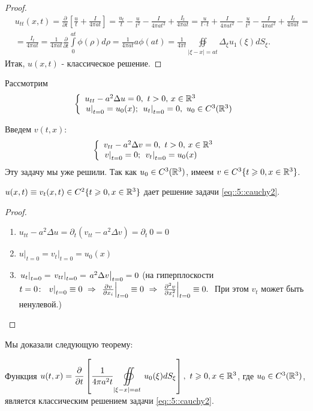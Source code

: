 \documentclass[../main.tex]{subfiles}
\begin{document}
\begin{proof}
\begin{equation*}
\begin{split}
&u_{tt}(x, t)=\frac{\partial}{\partial t}\left[\frac{u}{t}+\frac{I}{4\pi at} \right]=\frac{u_t}{t}-\frac{u}{t^2}-\frac{I}{4\pi at^2}+\frac{I_t}{4\pi at}=\frac{u}{t\cdot t}+\frac{I}{4\pi at^2}-\frac{u}{t^2}-\frac{I}{4\pi at^2}+\frac{I_t}{4\pi at}=\\
&=\frac{I_t}{4\pi at}=\frac{1}{4\pi at}\frac{\partial}{\partial t}\int\limits_0^{at}\phi (\rho )d\rho = \frac{1}{4\pi at}a\phi(at)=\frac{1}{4\pi t}\oiint\limits_{|\xi - x|=at}\Delta_{\xi}u_1(\xi )dS_{\xi}.
\end{split}
\end{equation*}
Итак, $u(x, t)$ - классическое решение.
\end{proof}

Рассмотрим
\begin{equation}
\left\{
  \begin{array}{ll}
  u_{tt}-a^2\Delta u=0,\ t>0,\, x\in \mathbb{R}^3\\
  \left. u\right|_{t=0}=u_0(x);\ \left. u_t\right|_{t=0}=0,\ u_0\in C^3(\mathbb{R}^3)
  \end{array}
\right.
\label{eq::5::cauchy2}
\end{equation}

Введем $v(t, x)$:
\[
\left\{
  \begin{array}{ll}
  v_{tt}-a^2\Delta v=0,\ t>0,\, x\in \mathbb{R}^3\\
  \left. v\right|_{t=0}=0;\ \left. v_t\right|_{t=0}=u_0(x)
  \end{array}
\right.
\]
Эту задачу мы уже решили. Так как $u_0\in C^3(\mathbb{R}^3)$, имеем $v\in C^3\{t\geqslant 0, x\in\mathbb{R}^3\}$.
\begin{statement}
$u(x, t)\equiv v_t(x, t)\in C^2\{t\geqslant 0, x\in\mathbb{R}^3 \}$ дает решение задачи \eqref{eq::5::cauchy2}.
\end{statement}
\begin{proof}$\ $
\begin{enumerate}
\item $u_{tt} - a^2 \Delta u = \partial_t (v_{tt} - a^2 \Delta v) = \partial_t\: 0 = 0$
\item $\left. u\right|_{t=0}=\left. v_t\right|_{t=0}=u_0(x)$
\item $\left. u_t\right|_{t=0} = \left. v_{tt}\right|_{t=0}=\left. a^2 \Delta v\right|_{t=0}=0$ (на гиперплоскости $t=0\colon\ \while{v}{t=0} \equiv 0\ \Rightarrow\ \while{\pd{v}{x_i}}{t=0} \equiv 0\ \Rightarrow\ \while{\pdd{v}{x_i}}{t=0} \equiv 0.\;$ При этом $v_t$ может быть ненулевой.)
\end{enumerate}
\end{proof}
Мы доказали следующую теорему:
\begin{theorem}
Функция $u(t,x)=\dfrac{\partial}{\partial t}\left[\dfrac{1}{4\pi a^2t}\displaystyle\oiint\limits_{|\xi -x|=at}u_0(\xi )dS_{\xi } \right],\ t\geqslant 0,x\in\mathbb{R}^3$, где $u_0\in C^3(\mathbb{R}^3)$, \\[1em]
является классическим решением задачи \eqref{eq::5::cauchy2}. 
\end{theorem}
\end{document}
